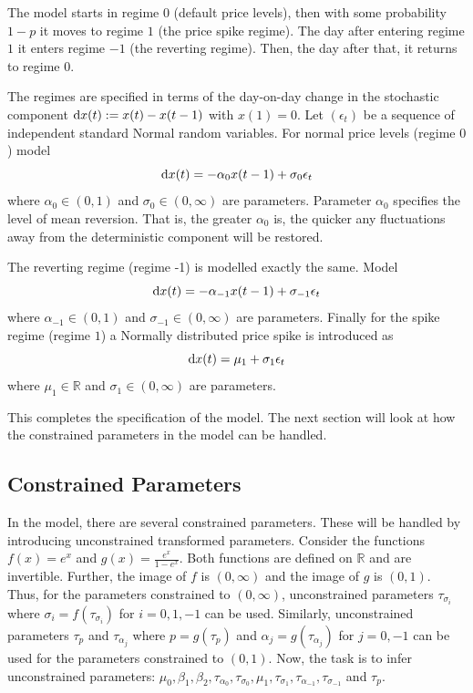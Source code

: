 

The model starts in regime $0$ (default price levels), then with some probability $1-p$ it moves to regime $1$ (the price spike regime). The day after entering regime $1$ it enters regime $-1$ (the reverting regime). Then, the day after that, it returns to regime $0$.

The regimes are specified in terms of the day-on-day change in the stochastic component $\mathop{}\!\mathrm{d}{x(t)} := x(t) - x(t-1)$ with $x(1)=0$. Let $(\epsilon_t)$ be a sequence of independent standard Normal random variables. For normal price levels (regime $0$) model
\begin{equation}
    \mathop{}\!\mathrm{d}{x(t)} = -\alpha_0 x(t-1) + \sigma_0 \epsilon_t
\end{equation}
where $\alpha_0 \in (0,1)$ and $\sigma_0 \in (0, \infty)$ are parameters. Parameter $\alpha_0$ specifies the level of mean reversion. That is, the greater $\alpha_0$ is, the quicker any fluctuations away from the deterministic component will be restored.

The reverting regime (regime -1) is modelled exactly the same. Model
\begin{equation}
    \mathop{}\!\mathrm{d}{x(t)} = -\alpha_{-1} x(t-1) + \sigma_{-1} \epsilon_t
\end{equation}
where $\alpha_{-1} \in (0,1)$ and $\sigma_{-1} \in (0, \infty)$ are parameters.
Finally for the spike regime (regime $1$) a Normally distributed price spike is introduced as
\begin{equation}
    \label{eqn:spike}
    \mathop{}\!\mathrm{d}{x(t)} = \mu_1 + \sigma_{1} \epsilon_t
\end{equation}
where $\mu_1 \in \mathbb{R}$ and $\sigma_1 \in (0, \infty)$ are parameters.

This completes the specification of the model. The next section will look at how the constrained parameters in the model can be handled.

\subsection{Constrained Parameters}
\label{subsec:constr-par}
In the model, there are several constrained parameters. These will be handled by introducing unconstrained transformed parameters. Consider the functions $f(x) = e^x$ and $g(x) = \frac{e^x}{1 - e^x}$. Both functions are defined on $\mathbb{R}$ and are invertible. Further, the image of $f$ is $(0, \infty)$ and the image of $g$ is $(0,1)$. Thus, for the parameters constrained to $(0, \infty)$, unconstrained parameters $\tau_{\sigma_i}$ where $\sigma_i = f(\tau_{\sigma_i})$ for $i=0, 1, -1$ can be used. Similarly, unconstrained parameters $\tau_p$ and $\tau_{\alpha_j}$ where $p = g(\tau_p)$ and $\alpha_j = g(\tau_{\alpha_j})$ for $j=0,-1$ can be used for the parameters constrained to $(0,1)$. Now, the task is to infer unconstrained parameters: $\mu_0, \beta_1, \beta_2, \tau_{\alpha_0}, \tau_{\sigma_0}, \mu_1, \tau_{\sigma_1}, \tau_{\alpha_{-1}}, \tau_{\sigma_{-1}}$ and $\tau_p$.

